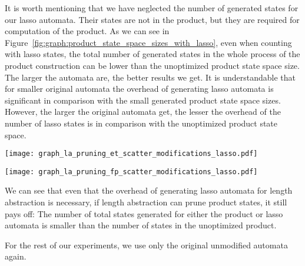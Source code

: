 It is worth mentioning that we have neglected the number of generated states for our lasso automata. Their states are not in the product, but they are required for computation of the product. As we can see in Figure~\ref{fig:graph:product_state_space_sizes_with_lasso}, even when counting with lasso states, the total number of generated states in the whole process of the product construction can be lower than the unoptimized product state space size. The larger the automata are, the better results we get. It is understandable that for smaller original automata the overhead of generating lasso automata is significant in comparison with the small generated product state space sizes. However, the larger the original automata get, the lesser the overhead of the number of lasso states is in comparison with the unoptimized product state space.

\begin{figure*}[ht]
    \centering
    \begin{minipage}{0.49\linewidth}
        \centering
        \texttt{[image: graph\_la\_pruning\_et\_scatter\_modifications\_lasso.pdf]}
        \caption{Emptiness problem.}
        \label{fig:graph:et_state_space_sizes_comp_with_lasso}
    \end{minipage}
    \hfill
    \begin{minipage}{0.49\linewidth}
        \centering
        \texttt{[image: graph\_la\_pruning\_fp\_scatter\_modifications\_lasso.pdf]}
        \caption{Product construction.}
        \label{fig:graph:fp_state_space_sizes_comp_with_lasso}
    \end{minipage}
    \vspace{0.5cm}
    \caption{Comparison of state space sizes in unoptimized product and product optimized by length abstraction with a sum of states generated for both lasso automata. Both axes are in symmetrical logarithmic scale, x-axis showing the number of states in the unoptimized product, y-axis the number of states in the optimized product.}
    \label{fig:graph:product_state_space_sizes_with_lasso}
\end{figure*}

We can see that even that the overhead of generating lasso automata for length abstraction is necessary, if length abstraction can prune product states, it still pays off: The number of total states generated for either the product or lasso automata is smaller than the number of states in the unoptimized product.

For the rest of our experiments, we use only the original unmodified automata again.


